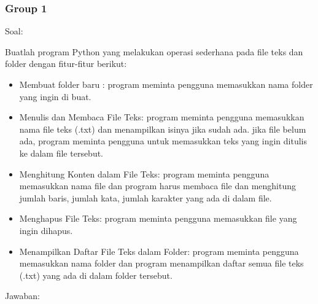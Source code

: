 \documentclass[12pt]{article}
\begin{document}
\subsubsection{Group 1}
Soal:
\par Buatlah program Python yang melakukan operasi sederhana pada file teks dan folder dengan fitur-fitur berikut:
\begin{itemize}
    \item Membuat folder baru : program meminta pengguna memasukkan nama folder yang ingin di buat.
    \item Menulis dan Membaca File Teks: program meminta pengguna memasukkan nama file teks (.txt) dan menampilkan isinya jika sudah ada. jika file belum ada, program meminta pengguna untuk memasukkan teks yang ingin ditulis ke dalam file tersebut.
    \item Menghitung Konten dalam File Teks: program meminta pengguna memasukkan nama file dan program harus membaca file dan menghitung jumlah baris, jumlah kata, jumlah karakter yang ada di dalam file.
    \item Menghapus File Teks: program meminta pengguna memasukkan file yang ingin dihapus.
    \item Menampilkan Daftar File Teks dalam Folder: program meminta pengguna memasukkan nama folder dan program menampilkan daftar semua file teks (.txt) yang ada di dalam folder tersebut.
\end{itemize}
Jawaban:
\end{document}

